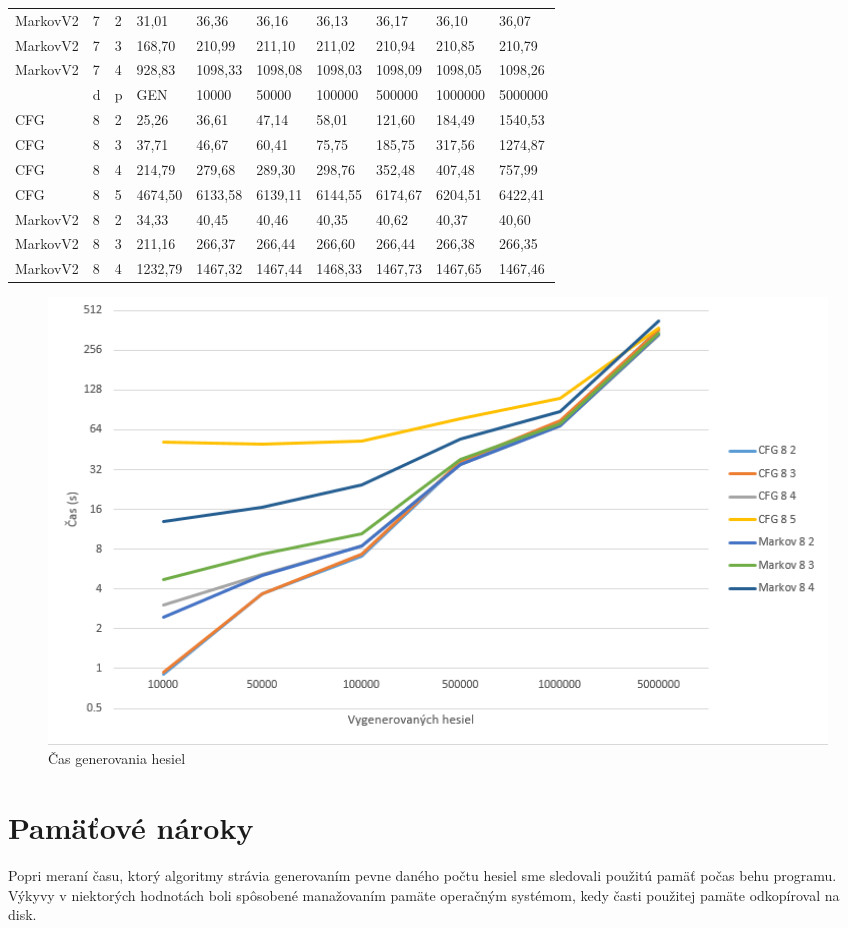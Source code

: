 \begin{table}[]
\begin{tabular}{lll|lllllll}
MarkovV2 & 7 & 2 & 31,01    & 36,36  & 36,16  & 36,13 & 36,17  & 36,10  & 36,07 \\
MarkovV2 & 7 & 3 & 168,70     & 210,99 & 211,10  & 211,02 & 210,94 & 210,85  & 210,79  \\
MarkovV2 & 7 & 4 & 928,83     & 1098,33   & 1098,08 & 1098,03 & 1098,09 & 1098,05  & 1098,26 \\ \hline
       & d & p & GEN     & 10000  & 50000  & 100000 & 500000 & 1000000 & 5000000 \\ \hline
CFG    & 8 & 2 & 25,26   & 36,61  & 47,14  & 58,01  & 121,60 & 184,49  & 1540,53 \\
CFG    & 8 & 3 & 37,71   & 46,67  & 60,41   & 75,75  & 185,75 & 317,56  & 1274,87 \\
CFG    & 8 & 4 & 214,79   & 279,68  & 289,30  & 298,76  & 352,48 & 407,48  & 757,99 \\
CFG    & 8 & 5 & 4674,50 & 6133,58 & 6139,11 & 6144,55 & 6174,67 & 6204,51 & 6422,41 \\
MarkovV2 & 8 & 2 & 34,33     & 40,45  & 40,46  & 40,35 & 40,62 & 40,37 & 40,60 \\
MarkovV2 & 8 & 3 & 211,16    & 266,37  & 266,44  & 266,60 & 266,44 & 266,38  & 266,35 \\
MarkovV2 & 8 & 4 & 1232,79   & 1467,32 & 1467,44 & 1468,33 & 1467,73 & 1467,65  & 1467,46
\end{tabular}
\end{table} 

\begin{figure}[ht]
    \centering
    \includegraphics[width=1\textwidth]{generateTime}
    \caption{Čas generovania hesiel}
    \label{fig:generateTime}
\end{figure}

\section{Pamäťové nároky}
Popri meraní času, ktorý algoritmy strávia generovaním pevne daného počtu hesiel sme sledovali použitú pamäť počas behu programu. Výkyvy v niektorých hodnotách boli spôsobené manažovaním pamäte operačným systémom, kedy časti použitej pamäte odkopíroval na disk.

